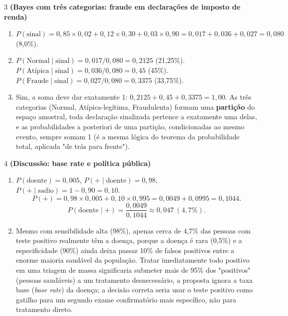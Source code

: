 \documentclass[11pt]{article}
\begin{document}
\begin{questao}{3} \textbf{(Bayes com três categorias: fraude em declarações de imposto de renda)}
\begin{solucao}
\begin{enumerate}[label=(\alph*)]
  \item $P(\text{sinal}) = 0{,}85\times 0{,}02 + 0{,}12\times 0{,}30 + 0{,}03\times 0{,}90
    = 0{,}017 + 0{,}036 + 0{,}027 = 0{,}080$ (8,0\%).
  \item $P(\text{Normal}\mid\text{sinal}) = 0{,}017/0{,}080 = 0{,}2125$ (21,25\%).
    $P(\text{Atípica}\mid\text{sinal}) = 0{,}036/0{,}080 = 0{,}45$ (45\%).
    $P(\text{Fraude}\mid\text{sinal}) = 0{,}027/0{,}080 = 0{,}3375$ (33,75\%).
  \item Sim, a soma deve dar exatamente 1: $0{,}2125+0{,}45+0{,}3375=1{,}00$. As três categorias
    (Normal, Atípica-legítima, Fraudulenta) formam uma \textbf{partição} do espaço amostral, toda
    declaração sinalizada pertence a exatamente uma delas, e as probabilidades a posteriori de
    uma partição, condicionadas ao mesmo evento, sempre somam 1 (é a mesma lógica do teorema da
    probabilidade total, aplicada "de trás para frente").
\end{enumerate}
\end{solucao}
\end{questao}

\begin{questao}{4} \textbf{(Discussão: base rate e política pública)}
\begin{solucao}
\begin{enumerate}[label=(\alph*)]
  \item $P(\text{doente})=0{,}005$, $P(+\mid\text{doente})=0{,}98$,
    $P(+\mid\text{sadio})=1-0{,}90=0{,}10$.
    $$
    P(+) = 0{,}98\times 0{,}005 + 0{,}10\times 0{,}995 = 0{,}0049+0{,}0995 = 0{,}1044.
    $$
    $$
    P(\text{doente}\mid +) = \frac{0{,}0049}{0{,}1044} \approx 0{,}047 \ (4{,}7\%).
    $$
  \item Mesmo com sensibilidade alta (98\%), apenas cerca de 4,7\% das pessoas com teste positivo
    realmente têm a doença, porque a doença é rara (0,5\%) e a especificidade (90\%) ainda deixa
    passar 10\% de falsos positivos entre a enorme maioria saudável da população. Tratar
    imediatamente todo positivo em uma triagem de massa significaria submeter mais de 95\% dos
    "positivos" (pessoas saudáveis) a um tratamento desnecessário, a proposta ignora a taxa base
    (\emph{base rate}) da doença; a decisão correta seria usar o teste positivo como gatilho para
    um segundo exame confirmatório mais específico, não para tratamento direto.
\end{enumerate}
\end{solucao}
\end{questao}
\end{document}
